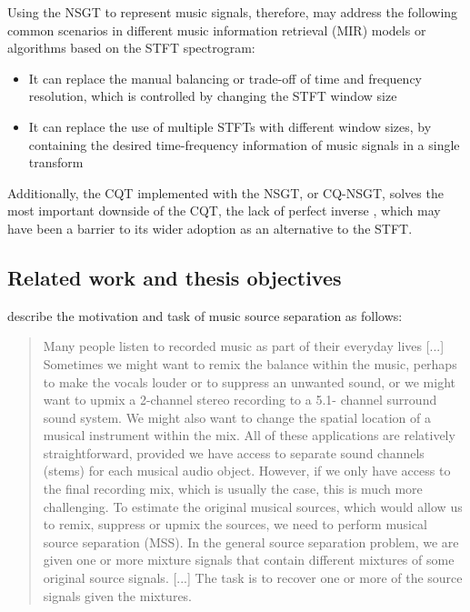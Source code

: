 \documentclass[letter,12pt,notitlepage]{article}
\begin{document}
Using the NSGT to represent music signals, therefore, may address the following common scenarios in different music information retrieval (MIR) models or algorithms based on the STFT spectrogram:

\begin{itemize}
	\item
		It can replace the manual balancing or trade-off of time and frequency resolution, which is controlled by changing the STFT window size
	\item
		It can replace the use of multiple STFTs with different window sizes, by containing the desired time-frequency information of music signals in a single transform
\end{itemize}

Additionally, the CQT implemented with the NSGT, or CQ-NSGT, solves the most important downside of the CQT, the lack of perfect inverse \cite{jbrown, klapuricqt, fitzgeraldcqt}, which may have been  a barrier to its wider adoption as an alternative to the STFT.

\subsection{Related work and thesis objectives}


\citet{musicsepgood} describe the motivation and task of music source separation as follows:

\begin{quote}
	Many people listen to recorded music as part of their everyday lives [...] Sometimes we might want to remix the balance within the music, perhaps to make the vocals louder or to suppress an unwanted sound, or we might want to upmix a 2-channel stereo recording to a 5.1- channel surround sound system. We might also want to change the spatial location of a musical instrument within the mix. All of these applications are relatively straightforward, provided we have access to separate sound channels (stems) for each musical audio object. However, if we only have access to the final recording mix, which is usually the case, this is much more challenging. To estimate the original musical sources, which would allow us to remix, suppress or upmix the sources, we need to perform musical source separation (MSS). In the general source separation problem, we are given one or more mixture signals that contain different mixtures of some original source signals. [...] The task is to recover one or more of the source signals given the mixtures.
\end{quote}
\end{document}
